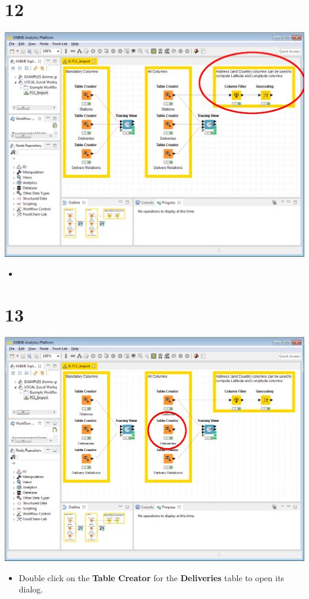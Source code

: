 \documentclass{beamer}
\begin{document}
\section{12}
\begin{frame}
	\begin{center}
  		\includegraphics[height=0.6\textheight]{12.png}
	\end{center}
	\begin{itemize}
		\item
	\end{itemize}
\end{frame}

\section{13}
\begin{frame}
	\begin{center}
  		\includegraphics[height=0.6\textheight]{13.png}
	\end{center}
	\begin{itemize}
		\item Double click on the \textbf{Table Creator} for the \textbf{Deliveries} table to open its dialog.
	\end{itemize}
\end{frame}
\end{document}
